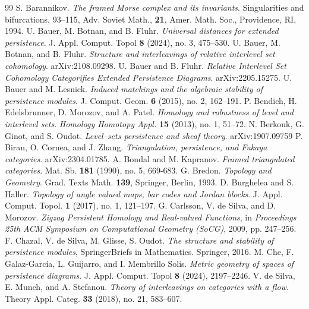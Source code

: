 \documentclass[11pt]{amsart}
\theoremstyle{definition}
\theoremstyle{remark}
\numberwithin{equation}{section}
\begin{document}
  
  
\begin{thebibliography}{99} 
	 S. Barannikov. \emph{The framed Morse complex and its invariants}. Singularities and bifurcations, 93--115, Adv. Soviet Math., \textbf{21}, Amer. Math. Soc., Providence, RI, 1994.
	 U. Bauer, M. Botnan, and B. Fluhr. \emph{Universal distances for extended persistence}.  J. Appl. Comput. Topol \textbf{8} (2024), no. 3, 475--530.
	 U. Bauer, M. Botnan, and B. Fluhr. \emph{Structure and interleavings of relative interlevel set cohomology}. arXiv:2108.09298.
	 U. Bauer and B. Fluhr. \emph{Relative Interlevel Set Cohomology Categorifies Extended Persistence Diagrams}. arXiv:2205.15275.
	 U. Bauer and M. Lesnick. \emph{Induced matchings and the algebraic stability of persistence modules}. J. Comput. Geom. \textbf{6} (2015), no. 2, 162--191.
	 P. Bendich, H. Edelsbrunner, D. Morozov, and A. Patel. \emph{Homology and robustness of level and interlevel sets}. \emph{Homology Homotopy Appl.} \textbf{15} (2013), no. 1, 51--72.
	 N. Berkouk, G. Ginot, and S. Oudot. \emph{Level--sets persistence and sheaf theory}. arXiv:1907.09759
	 P. Biran, O. Cornea, and J. Zhang. \emph{Triangulation, persistence, and Fukaya categories}. arXiv:2304.01785.
	 A. Bondal and M. Kapranov. \emph{Framed triangulated categories}. Mat. Sb. \textbf{181} (1990), no. 5, 669-683.
	 G. Bredon. \emph{Topology and Geometry}. Grad. Texts Math. \textbf{139}, Springer, Berlin, 1993.
	 D. Burghelea and S. Haller. \emph{Topology of angle valued maps, bar codes and Jordan blocks}. J. Appl. Comput. Topol. \textbf{1} (2017), no. 1, 121--197.
	 G. Carlsson, V. de Silva, and D. Morozov. \emph{Zigzag Persistent Homology and Real-valued Functions}, in  \emph{Proceedings 25th ACM Symposium on Computational Geometry (SoCG)}, 2009, pp. 247--256.
	 F. Chazal, V. de Silva, M. Glisse, S. Oudot. \emph{The structure and stability of persistence modules},  SpringerBriefs in Mathematics. Springer, 2016.
	 M. Che,   F. Galaz-Garc\'ia, L. Guijarro, and I. Membrillo Solis. \emph{Metric geometry of spaces of persistence diagrams}. J. Appl. Comput. Topol \textbf{8} (2024), 2197--2246.
	 V. de Silva, E. Munch, and A. Stefanou. \emph{Theory of interleavings on categories with a flow}. Theory Appl. Categ. \textbf{33} (2018), no. 21,  583--607.

\end{thebibliography}
\end{document}
